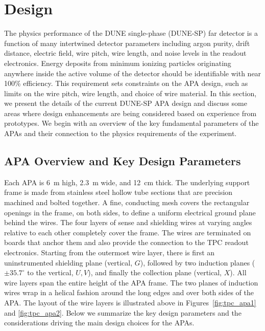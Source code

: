 \section{Design}
\label{sec:fdsp-apa-design}

The physics performance of the DUNE single-phase (DUNE-SP) far detector is a function of many intertwined detector parameters including argon purity, drift distance, electric field, wire pitch, wire length, and noise levels in the readout electronics.  Energy deposits from minimum ionizing particles originating anywhere inside the active volume of the detector should be identifiable with near 100\% efficiency.  This requirement sets constraints on the APA design, such as limits on the wire pitch, wire length, and choice of wire material.  In this section, we present the details of the current DUNE-SP APA design and discuss some areas where design enhancements are being considered based on experience from prototypes.  We begin with an overview of the key fundamental parameters of the APAs and their connection to the physics requirements of the experiment. 


\subsection{APA Overview and Key Design Parameters}
\label{sec:fdsp-apa-design-overview}

Each APA is \SI{6}{m} high, \SI{2.3}{m} wide, and \SI{12}{cm} thick.  The underlying support frame is made from stainless steel hollow tube sections that are precision machined and bolted together. A fine, conducting mesh covers the rectangular openings in the frame, on both sides, to define a uniform electrical ground plane behind the wires. The four layers of sense and shielding wires at varying angles relative to each other completely cover the frame. The wires are terminated on boards that anchor them and also provide the connection to the TPC readout electronics. Starting from the outermost wire layer, there is first an uninstrumented shielding plane (vertical, $G$), followed by two induction planes ($\pm 35.7^{\circ}$ to the vertical, $U,V$), and finally the collection plane (vertical, $X$). All wire layers span the entire height of the APA frame. The two planes of induction wires wrap in a helical fashion around the long edges and over both sides of the APA. The layout of the wire layers is illustrated above in Figures~\ref{fig:tpc_apa1} and \ref{fig:tpc_apa2}.  Below we summarize the key design parameters and the considerations driving the main design choices for the APAs.  %

